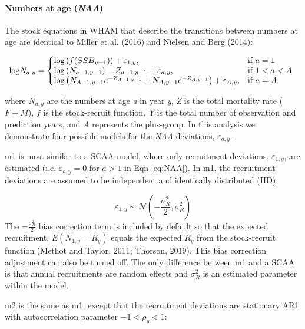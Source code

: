 \documentclass[]{article}
\let\oldparagraph\paragraph
\renewcommand{\paragraph}[1]{\oldparagraph{#1}\mbox{}}
\begin{document}
\hypertarget{numbers-at-age-naa}{%
\paragraph{\texorpdfstring{Numbers at age
(\emph{NAA})}{Numbers at age (NAA)}}\label{numbers-at-age-naa}}

The stock equations in WHAM that describe the transitions between
numbers at age are identical to Miller et al. (2016) and Nielsen and
Berg (2014):

\begin{equation}
\label{eq:NAA}
  \text{log}N_{a,y}=\left\{
    \begin{array}{@{}lll@{}}
      \text{log} \left( f(SSB_{y-1}) \right) + \varepsilon_{1,y}, & \text{if}\ a = 1 \\
      \text{log} \left( N_{a-1,y-1} \right) - Z_{a-1,y-1} + \varepsilon_{a,y}, & \text{if}\ 1 < a < A \\
      \text{log} \left( N_{A-1,y-1} e^{-Z_{A-1,y-1}} + N_{A,y-1} e^{-Z_{A,y-1}} \right) + \varepsilon_{A,y}, & \text{if}\ a = A
    \end{array}\right.
\end{equation}

where \(N_{a,y}\) are the numbers at age \emph{a} in year \emph{y},
\emph{Z} is the total mortality rate (\(F + M\)), \(f\) is the
stock-recruit function, \emph{Y} is the total number of observation and
prediction years, and \emph{A} represents the plus-group. In this
analysis we demonstrate four possible models for the \emph{NAA}
deviations, \(\varepsilon_{a,y}\).

m1 is most similar to a SCAA model, where only recruitment deviations,
\(\varepsilon_{1,y}\), are estimated (i.e. \(\varepsilon_{a,y} = 0\) for
\(a > 1\) in Eqn \ref{eq:NAA}). In m1, the recruitment deviations are
assumed to be independent and identically distributed (IID):

\[\varepsilon_{1,y} \sim \mathcal{N}\left( - \frac{\sigma^2_R}{2}, \sigma^2_R \right)\]
The \(- \frac{\sigma^2_R}{2}\) bias correction term is included by
default so that the expected recruitment, \(E(N_{1,y} = R_y)\) equals
the expected \(R_y\) from the stock-recruit function (Methot and Taylor,
2011; Thorson, 2019). This bias correction adjustment can also be turned
off. The only difference between m1 and a SCAA is that annual
recruitments are random effects and \(\sigma^2_R\) is an estimated
parameter within the model.

m2 is the same as m1, except that the recruitment deviations are
stationary AR1 with autocorrelation parameter \(-1<\rho_y<1\):
\end{document}

